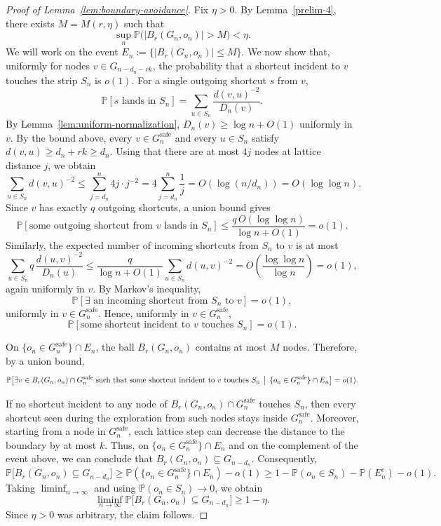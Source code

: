 \documentclass[10pt]{amsart}
\begin{document}
\begin{proof}[Proof of Lemma~\ref{lem:boundary-avoidance}]
Fix \(\eta>0\). By Lemma~\ref{prelim-4}, there exists \(M=M(r,\eta)\) such that
\[
\sup_n \mathbb P\bigl(|B_r(G_n,o_n)|>M\bigr)<\eta.
\]
We will work on the event
\(
E_n:=\{|B_r(G_n,o_n)|\le M\}.
\)
We now show that, uniformly for nodes \(v\in G_{n-d_n-rk}\), the probability that a shortcut incident to \(v\) touches the strip \(S_n\) is \(o(1)\). For a single outgoing shortcut \(s\) from \(v\),
\[
\mathbb P[\text{$s$ lands in }S_n]
=\sum_{u\in S_n}\frac{d(v,u)^{-2}}{D_n(v)}.
\]
By Lemma~\ref{lem:uniform-normalization}, \(D_n(v)\ge \log n+O(1)\) uniformly in \(v\). 
By the bound above, every $v\in G_n^{\mathrm{safe}}$ and every $u\in S_n$
  satisfy $d(v,u)\ge d_n+rk\ge d_n$.
Using that there are at most \(4j\) nodes at lattice distance \(j\), we obtain
\[
\sum_{u\in S_n} d(v,u)^{-2}
\le \sum_{j=d_n}^{n} 4j\cdot j^{-2}
=4\sum_{j=d_n}^{n}\frac1j
=O(\log(n/d_n))
=O(\log\log n).
\]
Since \(v\) has exactly \(q\) outgoing shortcuts, a union bound gives
\[
\mathbb P[\text{some outgoing shortcut from }v\text{ lands in }S_n]
\le \frac{q\,O(\log\log n)}{\log n+O(1)}
=o(1).
\]
Similarly, the expected number of incoming shortcuts from \(S_n\) to \(v\) is at most
\[
\sum_{u\in S_n} q\,\frac{d(u,v)^{-2}}{D_n(u)}
\le \frac{q}{\log n+O(1)}\sum_{u\in S_n} d(u,v)^{-2}
=O\!\left(\frac{\log\log n}{\log n}\right)
=o(1),
\]
again uniformly in \(v\). By Markov's inequality,
\[
\mathbb P[\exists \text{ an incoming shortcut from }S_n\text{ to }v]=o(1),
\]
uniformly in \(v\in G_n^{\mathrm{safe}}\). Hence, uniformly in \(v\in G_n^{\mathrm{safe}}\),
\[
\mathbb P[\text{some shortcut incident to }v\text{ touches }S_n]=o(1).
\]

On \(\{o_n\in G_n^{\mathrm{safe}}\}\cap E_n\), the ball \(B_r(G_n,o_n)\) contains at most \(M\) nodes. Therefore, by a union bound,
\[
\mathbb P\bigl[\exists v\in B_r(G_n,o_n)\cap G_n^{\mathrm{safe}}
\text{ such that some shortcut incident to }v\text{ touches }S_n \,\bigm|\, \{o_n\in G_n^{\mathrm{safe}}\}\cap E_n\bigr]
=o(1).
\]

If no shortcut incident to any node of \(B_r(G_n,o_n)\cap G_n^{\mathrm{safe}}\) touches \(S_n\), then every shortcut seen during the exploration from such nodes stays inside \(G_n^{\mathrm{safe}}\). Moreover, starting from a node in \(G_n^{\mathrm{safe}}\), each lattice step can decrease the distance to the boundary by at most \(k\). Thus, on \(\{o_n\in G_n^{\mathrm{safe}}\}\cap E_n\) and on the complement of the event above, we can conclude that
\(
B_r(G_n,o_n)\subseteq G_{n-d_n}.
\)
Consequently,
\[
\mathbb P\bigl[B_r(G_n,o_n)\subseteq G_{n-d_n}\bigr]
\ge \mathbb P(\{o_n\in G_n^{\mathrm{safe}}\}\cap E_n)-o(1)
\ge 1-\mathbb P(o_n\in S_n)-\mathbb P(E_n^c)-o(1).
\]
Taking \(\liminf_{n\to\infty}\) and using \(\mathbb P(o_n\in S_n)\to 0\), we obtain
\[
\liminf_{n\to\infty}\mathbb P\bigl[B_r(G_n,o_n)\subseteq G_{n-d_n}\bigr]\ge 1-\eta.
\]
Since \(\eta>0\) was arbitrary, the claim follows.
\end{proof}
\end{document}
